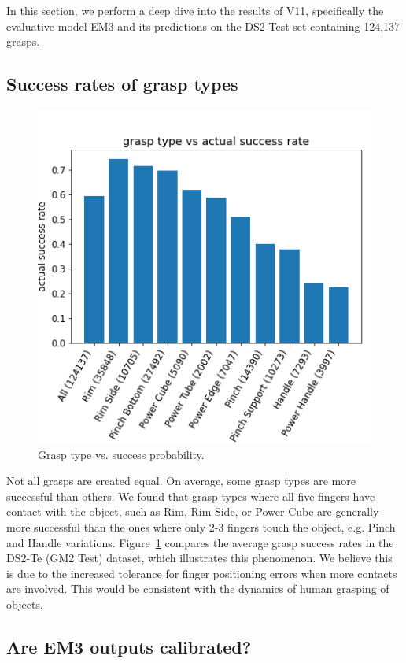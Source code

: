 
\noindent
In this section, we perform a deep dive into the results of V11, specifically the evaluative model EM3 and its predictions on the DS2-Test set containing 124,137 grasps. 

\subsection{Success rates of grasp types}
\noindent

\begin{figure}
\centering 
\includegraphics[width=0.5\columnwidth]{images/post-analysis/Grasp_type_vs_success_prob.png}
\caption{Grasp type vs. success probability.}
\label{fig:post2}
\end{figure}

Not all grasps are created equal. On average, some grasp types are more successful than others. We found that grasp types where all five fingers have contact with the object, such as Rim, Rim Side, or Power Cube are generally more successful than the ones where only 2-3 fingers touch the object, e.g. Pinch and Handle variations. Figure~\ref{fig:post2} compares the average grasp success rates in the DS2-Te (GM2 Test) dataset, which illustrates this phenomenon. We believe this is due to the increased tolerance for finger positioning errors when more contacts are involved. This would be consistent with the dynamics of human grasping of objects. 

\subsection{Are EM3 outputs calibrated?}
\noindent

